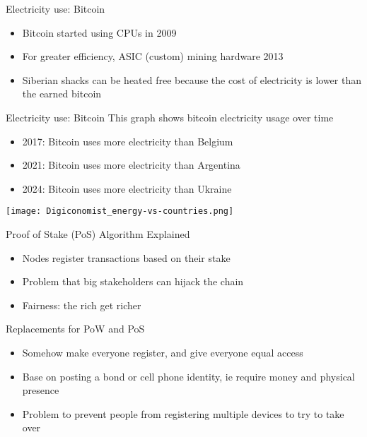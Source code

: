 \begin{withoutheadline}
\begin{frame}{Electricity use: Bitcoin}
    \begin{itemize}
        \item Bitcoin started using CPUs in 2009
        \item For greater efficiency, ASIC (custom) mining hardware 2013
        \item Siberian shacks can be heated free because the cost of electricity is lower than the earned bitcoin
    \end{itemize}
\end{frame}

\begin{frame}{Electricity use: Bitcoin}
This graph shows bitcoin electricity usage over time
\begin{itemize}
    \item 2017: Bitcoin uses more electricity than Belgium
    \item 2021: Bitcoin uses more electricity than Argentina
    \item 2024: Bitcoin uses more electricity than Ukraine
\end{itemize} 
\texttt{[image: Digiconomist\_energy-vs-countries.png]}
\end{frame}


\begin{frame}{Proof of Stake (PoS) Algorithm Explained}
    \begin{itemize}
        \item Nodes register transactions based on their stake
        \item Problem that big stakeholders can hijack the chain
        \item Fairness: the rich get richer
    \end{itemize}
\end{frame}

\begin{frame}{Replacements for PoW and PoS}
    \begin{itemize}
        \item Somehow make everyone register, and give everyone equal access
        \item Base on posting a bond or cell phone identity, ie require money and physical presence
        \item Problem to prevent people from registering multiple devices to try to take over
    \end{itemize}
\end{frame}


\end{withoutheadline}
